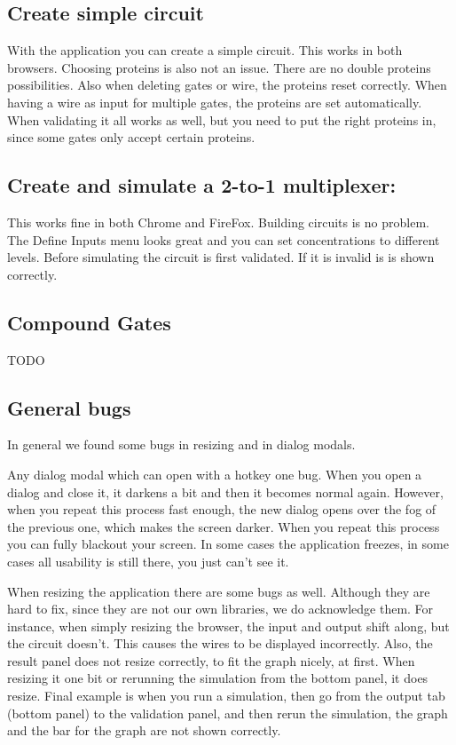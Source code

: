 \documentclass{article}
\begin{document}
\subsection{Create simple circuit}
With the application you can create a simple circuit. This works in both browsers. Choosing proteins is also not an issue. There are no double proteins possibilities. Also when deleting gates or wire, the proteins reset correctly. When having a wire as input for multiple gates, the proteins are set automatically. 
When validating it all works as well, but you need to put the right proteins in, since some gates only accept certain proteins.

\subsection{Create and simulate a 2-to-1 multiplexer:}
This works fine in both Chrome and FireFox. Building circuits is no problem. The Define Inputs menu looks great and you can set concentrations to different levels. Before simulating the circuit is first validated. If it is invalid is is shown correctly.

\subsection{Compound Gates}
TODO

\subsection{General bugs}
In general we found some bugs in resizing and in dialog modals.

Any dialog modal which can open with a hotkey one bug. When you open a dialog and close it, it darkens a bit and then it becomes normal again. However, when you repeat this process fast enough, the new dialog opens over the fog of the previous one, which makes the screen darker. When you repeat this process you can fully blackout your screen. In some cases the application freezes, in some cases all usability is still there, you just can't see it.

When resizing the application there are some bugs as well. Although they are hard to fix, since they are not our own libraries, we do acknowledge them.
For instance, when simply resizing the browser, the input and output shift along, but the circuit doesn't. This causes the wires to be displayed incorrectly. Also, the result panel does not resize correctly, to fit the graph nicely, at first. When resizing it one bit or rerunning the simulation from the bottom panel, it does resize.
Final example is when you run a simulation, then go from the output tab (bottom panel) to the validation panel, and then rerun the simulation, the graph and the bar for the graph are not shown correctly.
\end{document}

